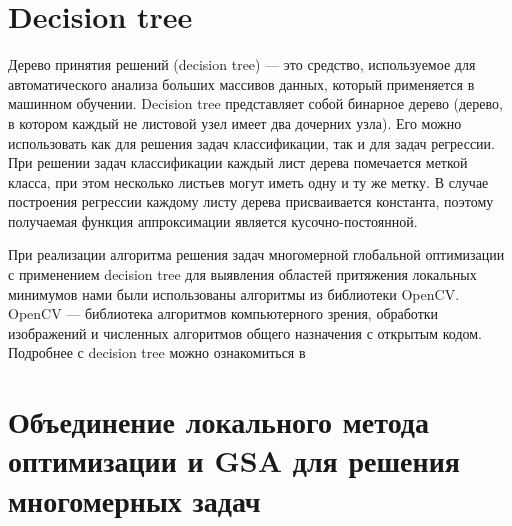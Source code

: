 \documentclass{svproc}
\begin{document}
\section{Decision tree}

Дерево принятия решений (decision tree) --- это средство, используемое для автоматического анализа больших массивов данных, который применяется в машинном обучении. Decision tree представляет собой бинарное дерево (дерево, в котором каждый не листовой узел имеет два дочерних узла). Его можно использовать как для решения задач классификации, так и для задач регрессии. При решении задач классификации каждый лист дерева помечается меткой класса, при этом несколько листьев могут иметь одну и ту же метку. В случае построения регрессии каждому листу дерева присваивается константа, поэтому получаемая функция аппроксимации является кусочно-постоянной.


При реализации алгоритма  решения задач многомерной глобальной оптимизации с применением decision tree для выявления областей притяжения локальных минимумов нами были использованы алгоритмы из библиотеки OpenCV. OpenCV --- библиотека алгоритмов компьютерного зрения, обработки изображений и численных алгоритмов общего назначения с открытым кодом. Подробнее с decision tree можно ознакомиться в \cite{fio_bib16}


\section{Объединение локального метода оптимизации и GSA для решения многомерных задач}
\end{document}
